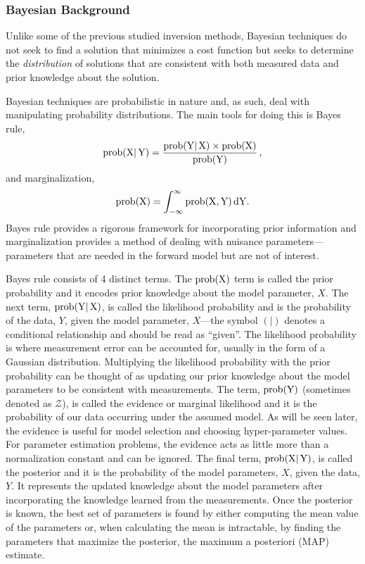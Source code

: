 \subsubsection{Bayesian Background}
Unlike some of the previous studied inversion methods, Bayesian techniques do not seek to find a solution that minimizes a cost function but seeks to determine the \textit{distribution} of solutions that are consistent with both measured data and prior knowledge about the solution.

Bayesian techniques are probabilistic in nature and, as such, deal with manipulating probability distributions. The main tools for doing this is Bayes rule,
\begin{equation}\label{eq:bayes_rule}
    \rm{prob}(X|\,Y) = \frac{\rm{prob}(Y|\,X) \times \rm{prob}(X)}{\rm{prob}(Y)}\,,
\end{equation}
and marginalization,
\begin{equation}\label{eq:marginalization}
    \rm{prob}(X) = \int_{-\infty}^{\infty} \rm{prob}(X,Y)\,dY .
\end{equation}
Bayes rule provides a rigorous framework for incorporating prior information and marginalization provides a method of dealing with nuisance parameters---parameters that are needed in the forward model but are not of interest.

Bayes rule consists of 4 distinct terms.
The $\rm{prob}(X)$ term is called the prior probability and it encodes prior knowledge about the model parameter, $X$.
The next term, $\rm{prob}(Y|\,X)$, is called the likelihood probability and is the probability of the data, $Y$, given the model parameter, $X$---the symbol $(|)$ denotes a conditional relationship and should be read as ``given''.
The likelihood probability is where measurement error can be accounted for, usually in the form of a Gaussian distribution.
Multiplying the likelihood probability with the prior probability can be thought of as updating our prior knowledge about the model parameters to be consistent with measurements.
The term, $\rm{prob}(Y)$ (sometimes denoted as $\mathcal{Z}$), is called the evidence or marginal likelihood and it is the probability of our data occurring under the assumed model.
As will be seen later, the evidence is useful for model selection and choosing hyper-parameter values. For parameter estimation problems, the evidence acts as little more than a normalization constant and can be ignored. 
The final term, $\rm{prob}(X|\,Y)$, is called the posterior and it is the probability of the model parameters, $X$, given the data, $Y$. It represents the updated knowledge about the model parameters after incorporating the knowledge learned from the measurements.
Once the posterior is known, the best set of parameters is found by either computing the mean value of the parameters or, when calculating the mean is intractable, by finding the parameters that maximize the posterior, the maximum a posteriori (MAP) estimate.

